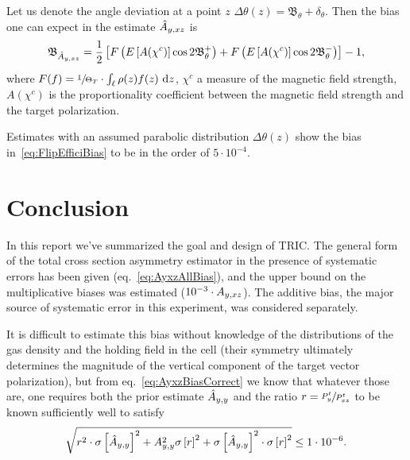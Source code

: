 \documentclass{article}
\newcommand{\bias}[1]{\mathfrak{B}_{#1}}
\newcommand{\rand}[1]{\delta_{#1}}
\begin{document}
Let us denote the angle deviation at a point $z$ $\Delta\theta(z) = \bias{\theta} + \rand{\theta}$. Then the bias one can expect in the estimate $\Ayxz*$ is~\cite{Diploma}
\begin{equation}\label{eq:FlipEfficiBias}
	\bias{\Ayxz*} = \frac{1}{2}\bkt*{F\bkt{\Xpct{A(\chi^c)}\cos2\bias{\theta}^+} + F\bkt{\Xpct{A(\chi^c)}\cos2\bias{\theta}^-}} - 1,
\end{equation}
where $F(f) = \sfrac{1}{\Thick[T]}\cdot\int_{\Lcell}\rho(z) f(z)~ \td z$, $\chi^c$ a measure of the magnetic field strength, $A(\chi^c)$ is the proportionality coefficient between the magnetic field strength and the target polarization.

Estimates with an assumed parabolic distribution $\Delta\theta(z)$ show the bias in~\eqref{eq:FlipEfficiBias} to be in the order of $5\cdot 10^{-4}$.~\cite{Diploma} 


\section*{Conclusion}
In this report we've summarized the goal and design of TRIC. The general form of the total cross section asymmetry estimator in the presence of systematic errors has been given (eq.~\eqref{eq:AyxzAllBias}), and the upper bound on the multiplicative biases was estimated ($10^{-3}\cdot\Ayxz$). The additive bias, the major source of systematic error in this experiment, was considered separately. 

It is difficult to estimate this bias without knowledge of the distributions of the gas density and the holding field in the cell (their symmetry ultimately determines the magnitude of the vertical component of the target vector polarization), but from eq.~\eqref{eq:AyxzBiasCorrect} we know that whatever those are, one requires both the prior estimate $\Ayy*$ and the ratio $r = \sfrac{P^t_y}{P^t_{xz}}$ to be known sufficiently well to satisfy
\begin{equation}
	\sqrt{r^2 \cdot\SE{\Ayy*}^2 + \Ayy^2\SE{r}^2 + \SE{\Ayy*}^2\cdot\SE{r}^2} \leq 1\cdot10^{-6}.
\end{equation}
\end{document}
